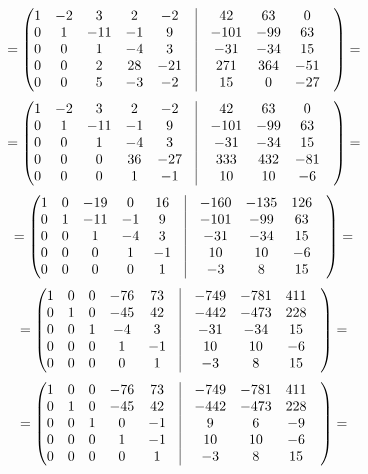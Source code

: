\documentclass[a4paper,12pt]{article}
\begin{document}
\[
=
\begin{pmatrix}
1 & -2 & 3 & 2 & -2 & \vrule &42 & 63 & 0 & \\
0 & 1 & -11 & -1 & 9 & \vrule &-101 & -99 & 63 & \\
0 & 0 & 1 & -4 & 3 & \vrule &-31 & -34 & 15 & \\
0 & 0 & 2 & 28 & -21 & \vrule &271 & 364 & -51 & \\
0 & 0 & 5 & -3 & -2 & \vrule &15 & 0 & -27 & \\
\end{pmatrix}
=
\]
\[
=
\begin{pmatrix}
1 & -2 & 3 & 2 & -2 & \vrule &42 & 63 & 0 & \\
0 & 1 & -11 & -1 & 9 & \vrule &-101 & -99 & 63 & \\
0 & 0 & 1 & -4 & 3 & \vrule &-31 & -34 & 15 & \\
0 & 0 & 0 & 36 & -27 & \vrule &333 & 432 & -81 & \\
0 & 0 & 0 & 1 & -1 & \vrule &10 & 10 & -6 & \\
\end{pmatrix}
=
\]
\[
=
\begin{pmatrix}
1 & 0 & -19 & 0 & 16 & \vrule &-160 & -135 & 126 & \\
0 & 1 & -11 & -1 & 9 & \vrule &-101 & -99 & 63 & \\
0 & 0 & 1 & -4 & 3 & \vrule &-31 & -34 & 15 & \\
0 & 0 & 0 & 1 & -1 & \vrule &10 & 10 & -6 & \\
0 & 0 & 0 & 0 & 1 & \vrule &-3 & 8 & 15 & \\
\end{pmatrix}
=
\]
\[
=
\begin{pmatrix}
1 & 0 & 0 & -76 & 73 & \vrule &-749 & -781 & 411 & \\
0 & 1 & 0 & -45 & 42 & \vrule &-442 & -473 & 228 & \\
0 & 0 & 1 & -4 & 3 & \vrule &-31 & -34 & 15 & \\
0 & 0 & 0 & 1 & -1 & \vrule &10 & 10 & -6 & \\
0 & 0 & 0 & 0 & 1 & \vrule &-3 & 8 & 15 & \\
\end{pmatrix}
=
\]
\[
=
\begin{pmatrix}
1 & 0 & 0 & -76 & 73 & \vrule &-749 & -781 & 411 & \\
0 & 1 & 0 & -45 & 42 & \vrule &-442 & -473 & 228 & \\
0 & 0 & 1 & 0 & -1 & \vrule &9 & 6 & -9 & \\
0 & 0 & 0 & 1 & -1 & \vrule &10 & 10 & -6 & \\
0 & 0 & 0 & 0 & 1 & \vrule &-3 & 8 & 15 & \\
\end{pmatrix}
=
\]
\end{document}
